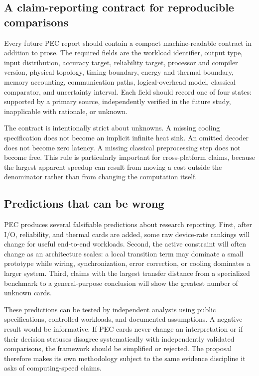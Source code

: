 \documentclass[conference]{IEEEtran}
\begin{document}
\subsection{A claim-reporting contract for reproducible comparisons}

Every future PEC report should contain a compact machine-readable contract in
addition to prose. The required fields are the workload identifier, output
type, input distribution, accuracy target, reliability target, processor and
compiler version, physical topology, timing boundary, energy and thermal
boundary, memory accounting, communication paths, logical-overhead model,
classical comparator, and uncertainty interval. Each field should record one
of four states: supported by a primary source, independently verified in the
future study, inapplicable with rationale, or unknown.

The contract is intentionally strict about unknowns. A missing cooling
specification does not become an implicit infinite heat sink. An omitted
decoder does not become zero latency. A missing classical preprocessing step
does not become free. This rule is particularly important for cross-platform
claims, because the largest apparent speedup can result from moving a cost
outside the denominator rather than from changing the computation itself.

\subsection{Predictions that can be wrong}

PEC produces several falsifiable predictions about research reporting. First,
after I/O, reliability, and thermal cards are added, some raw device-rate
rankings will change for useful end-to-end workloads. Second, the active
constraint will often change as an architecture scales: a local transition
term may dominate a small prototype while wiring, synchronization, error
correction, or cooling dominates a larger system. Third, claims with the
largest transfer distance from a specialized benchmark to a general-purpose
conclusion will show the greatest number of unknown cards.

These predictions can be tested by independent analysts using public
specifications, controlled workloads, and documented assumptions. A negative
result would be informative. If PEC cards never change an interpretation or
if their decision statuses disagree systematically with independently
validated comparisons, the framework should be simplified or rejected. The
proposal therefore makes its own methodology subject to the same evidence
discipline it asks of computing-speed claims.
\end{document}
